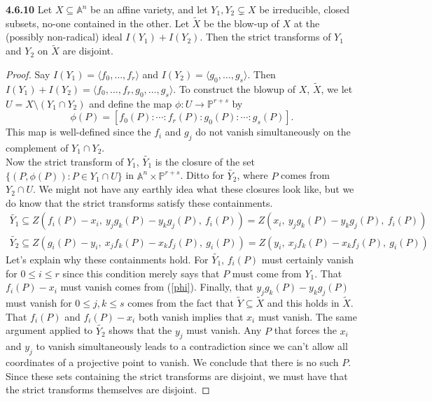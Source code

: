 \documentclass[11pt,letterpaper]{report}
\newcommand{\affine}{\mathbb{A}}
\newcommand{\proj}{\mathbb{P}}
\begin{document}
\noindent\textbf{4.6.10}
Let $X\subseteq \affine^n$ be an affine variety, and let $Y_1, Y_2\subsetneq X$ be irreducible, closed subsets, no-one contained in the other. Let $\tilde{X}$ be the blow-up of $X$ at the (possibly non-radical) ideal $I(Y_1)+I(Y_2)$. Then the strict transforms of $Y_1$ and $Y_2$ on $\tilde{X}$ are disjoint.
\begin{proof}
	Say $I(Y_1) = \langle f_0, \ldots, f_r\rangle$ and $I(Y_2) = \langle g_0, \ldots, g_s\rangle$. Then $I(Y_1)+I(Y_2) = \langle f_0, \ldots, f_r, g_0, \ldots, g_s\rangle$. To construct the blowup of $X$, $\tilde{X}$, we let $U = X\setminus (Y_1\cap Y_2)$ and define the map $\phi: U\to \proj^{r+s}$ by
	\begin{equation}\label{phi}
	\phi(P) = [f_0(P):\cdots:f_r(P):g_0(P):\cdots : g_s(P)].
	\end{equation}
	This map is well-defined since the $f_i$ and $g_j$ do not vanish simultaneously on the complement of $Y_1\cap Y_2$.\\

	\noindent Now the strict transform of $Y_1$, $\tilde{Y_1}$ is the closure of the set $\{(P, \phi(P)): P\in Y_1\cap U\}$ in  $\affine^n\times \proj^{r+s}$. Ditto for $\tilde{Y_2}$, where $P$ comes from $Y_2\cap U$. We might not have any earthly idea what these closures look like, but we do know that the strict transforms satisfy these containments.
	\begin{gather*}
		\tilde{Y_1}\subseteq Z(f_i(P) - x_i,\ y_jg_k(P) - y_kg_j(P),\ f_i(P)) = Z(x_i,\ y_jg_k(P)-y_kg_j(P),\ f_i(P))\\
		\tilde{Y_2}\subseteq Z(g_i(P) - y_i,\ x_jf_k(P) - x_kf_j(P),\ g_i(P)) = Z(y_i,\ x_jf_k(P)-x_kf_j(P),\ g_i(P))
	\end{gather*}
	Let's explain why these containments hold. For $\tilde{Y_1}$, $f_i(P)$ must certainly vanish for $0\leq i\leq r$ since this condition merely says that $P$ must come from $Y_1$. That $f_i(P)-x_i$ must vanish comes from (\ref{phi}). Finally, that $y_jg_k(P)-y_kg_j(P)$ must vanish for $0\leq j,k\leq s$ comes from the fact that $\tilde{Y}\subseteq \tilde{X}$ and this holds in $\tilde{X}$. That $f_i(P)$ and $f_i(P)-x_i$ both vanish implies that $x_i$ must vanish. The same argument applied to $\tilde{Y_2}$ shows that the $y_j$ must vanish. Any $P$ that forces the $x_i$ and $y_j$ to vanish simultaneously leads to a contradiction since we can't allow all coordinates of a projective point to vanish. We conclude that there is no such $P$. Since these sets containing the strict transforms are disjoint, we must have that the strict transforms themselves are disjoint.
\end{proof}
\end{document}
